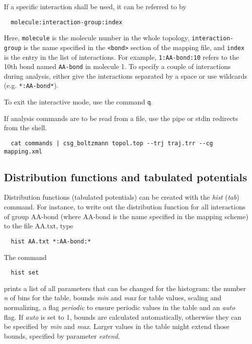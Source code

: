 If a specific interaction shall be used, it can be referred to by
\begin{verbatim}
  molecule:interaction-group:index
\end{verbatim}
Here, \texttt{molecule} is the molecule number in the whole topology, \texttt{interaction-group} is the name specified in the \texttt{<bond>} section of the mapping file, and \texttt{index} is the entry in the list of interactions. For example, \texttt{1:AA-bond:10} refers to the 10th bond named \texttt{AA-bond} in molecule 1. To specify a couple of interactions during analysis, either give the interactions separated by a space or use wildcards (e.g. \texttt{*:AA-bond*}).

To exit the interactive mode, use the command \texttt{q}. 

If analysis commands are to be read from a file, use the pipe or stdin redirects from the shell.
\begin{verbatim}
  cat commands | csg_boltzmann topol.top --trj traj.trr --cg mapping.xml
\end{verbatim}

\subsection{Distribution functions and tabulated potentials}
Distribution functions (tabulated potentials) can be created with the \textit{hist} (\textit{tab}) command.
For instance, to write out the distribution function for all interactions of group AA-bond (where AA-bond is the name specified in the mapping scheme) to the file AA.txt, type
\begin{verbatim}
  hist AA.txt *:AA-bond:*
\end{verbatim}
The command
\begin{verbatim}
  hist set
\end{verbatim}
prints a list of all parameters that can be changed for the histogram: the number \textit{n} of bins for the table, bounds \textit{min} and \textit{max} for table values, scaling and normalizing, a flag \textit{periodic} to ensure periodic values in the table and an \textit{auto} flag. If \textit{auto} is set to 1, bounds are calculated automatically, otherwise they can be specified by \textit{min} and \textit{max}. Larger values in the table might extend those bounds, specified by parameter \textit{extend}.

